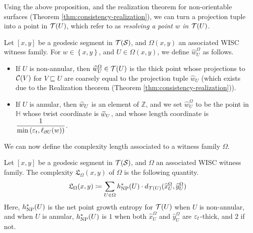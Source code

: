 \documentclass[12pt, reqno]{amsart}
\begin{document}
  Using the above proposition, and the realization theorem for non-orientable surfaces (Theorem \ref{thm:consistency-realization}), we can turn a projection tuple into a point in $\mathcal{T}(U)$, which \textcite{dowdall2023lattice} refer to as \emph{resolving a point $w$ in $\mathcal{T}(U)$}.
  \begin{definition}
    Let $[x,y]$ be a geodesic segment in $\mathcal{T}(\mathcal{S})$, and $\Omega(x,y)$ an associated WISC witness family.
    For $w \in \left\{ x, y \right\}$, and $U \in \Omega(x,y)$, we define $\widehat{w}_U^{\Omega}$ as follows.
    \begin{itemize}
    \item If $U$ is non-annular, then $\widehat{w}_U^{\Omega} \in \mathcal{T}(U)$ is the thick point whose projections to $\mathcal{C}(V)$ for $V \sqsubseteq U$ are coarsely equal to the projection tuple $\widehat{w}_U$ (which exists due to the Realization theorem (Theorem \ref{thm:consistency-realization})).
    \item If $U$ is annular, then $\widetilde{w}_U$ is an element of $\mathbb{Z}$, and we set $\widehat{w}_U^{\Omega}$ to be the point in $\mathbb{H}$ whose twist coordinate is $\widetilde{w}_U$, and whose length coordinate is $\displaystyle \frac{1}{\min\left( {\varepsilon_t}, \ell_{\partial U}(w) \right)}$.
    \end{itemize}
  \end{definition}

  We can now define the complexity length associated to a witness family $\Omega$.

  \begin{definition}
    Let $[x, y]$ be a geodesic segment in $\mathcal{T}(\mathcal{S})$, and $\Omega$ an associated WISC witness family.
    The complexity $\mathfrak{L}_{\Omega}(x,y)$ of $\Omega$ is the following quantity.
    \begin{align*}
      \mathfrak{L}_{\Omega}(x,y) \coloneqq \sum_{U \in \Omega} h_{\mathrm{NP}}^{\ast}(U) \cdot d_{\mathcal{T}(U)}(\widehat{x}_{U}^{\Omega}, \widehat{y}_{U}^{\Omega})
    \end{align*}
    Here, $h_{\mathrm{NP}}^{\ast}(U)$ is the net point growth entropy for $\mathcal{T}(U)$ when $U$ is non-annular, and when $U$ is annular, $h_{\mathrm{NP}}^{\ast}(U)$ is $1$ when both $\widehat{x}_{U}^{\Omega}$ and $\widehat{y}_{U}^{\Omega}$ are ${\varepsilon_t}$-thick, and $2$ if not.
  \end{definition}
\end{document}
